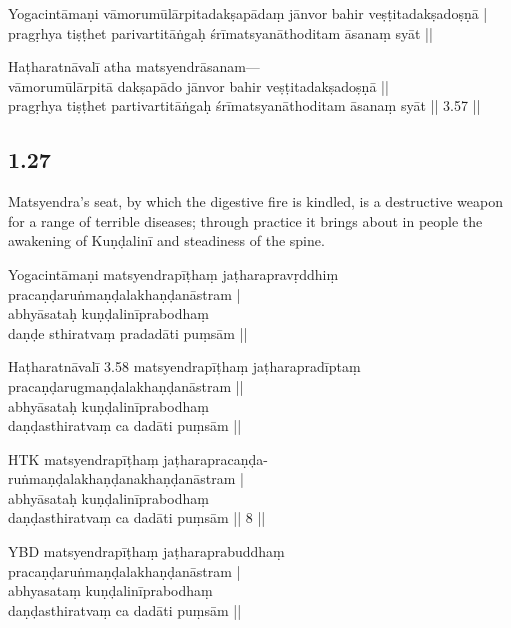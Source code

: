 \begin{ekdosis}
\begin{testimonia}[hp01_026]
Yogacintāmaṇi
\startverse
vāmorumūlārpitadakṣapādaṃ
jānvor bahir veṣṭitadakṣadoṣṇā |\\
pragṛhya tiṣṭhet parivartitāṅgaḥ
śrīmatsyanāthoditam āsanaṃ syāt ||
\endverse

Haṭharatnāvalī
\startverse
atha matsyendrāsanam---\\
vāmorumūlārpitā dakṣapādo jānvor bahir veṣṭitadakṣadoṣṇā ||\\
pragṛhya tiṣṭhet partivartitāṅgaḥ śrīmatsyanāthoditam āsanaṃ syāt || 3.57 ||
\endverse
\end{testimonia}

\subsection*{1.27}
\begin{translation}[hp01_027]
Matsyendra's seat, by which the digestive fire is kindled, is a destructive weapon for a range of terrible diseases; through practice it brings about in people the awakening of Kuṇḍalinī and steadiness of the spine.
\end{translation}

\begin{testimonia}[hp01_027]
Yogacintāmaṇi
\startverse
matsyendrapīṭhaṃ jaṭharapravṛddhiṃ\\
pracaṇḍaruṅmaṇḍalakhaṇḍanāstram |\\
abhyāsataḥ kuṇḍalinīprabodhaṃ\\
daṇḍe sthiratvaṃ pradadāti puṃsām ||
\endverse

Haṭharatnāvalī 3.58
\startverse
matsyendrapīṭhaṃ jaṭharapradīptaṃ \\
pracaṇḍarugmaṇḍalakhaṇḍanāstram ||\\
abhyāsataḥ kuṇḍalinīprabodhaṃ \\
daṇḍasthiratvaṃ ca dadāti puṃsām ||
\endverse

HTK
\startverse
matsyendrapīṭhaṃ jaṭharapracaṇḍa-\\
ruṅmaṇḍalakhaṇḍanakhaṇḍanāstram |\\
abhyāsataḥ kuṇḍalinīprabodhaṃ \\
daṇḍasthiratvaṃ ca dadāti puṃsām || 8 ||
\endverse

YBD
\startverse
matsyendrapīṭhaṃ jaṭharaprabuddhaṃ\\
pracaṇḍaruṅmaṇḍalakhaṇḍanāstram |\\
abhyasataṃ kuṇḍalinīprabodhaṃ\\
daṇḍasthiratvaṃ ca dadāti puṃsām ||
\endverse
\end{testimonia}


\end{ekdosis}
